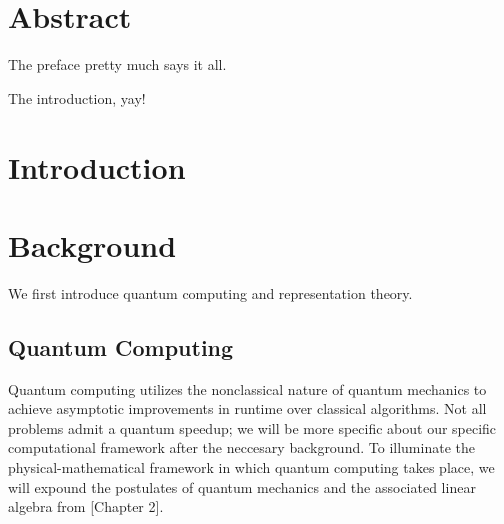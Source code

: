 \documentclass[12pt,twoside]{reedthesis}
\theoremstyle{plain}   %
\theoremstyle{definition}
\theoremstyle{remark}
\numberwithin{equation}{section}
\begin{document}
        \tableofcontents
        \listoftables
        \listoffigures

        \mainmatter %
        \pagestyle{fancyplain} %
        
        \chapter*{Abstract}
	The preface pretty much says it all.
	\onehalfspacing

	The introduction, yay!



        \chapter*{Introduction}
        
    \chapter{Background}
    
   We first introduce quantum computing and representation theory.
   \section{Quantum Computing}
   Quantum computing utilizes the nonclassical nature of quantum mechanics to achieve asymptotic improvements in runtime over classical algorithms.
   Not all problems admit a quantum speedup; we will be more specific about our specific computational framework after the neccesary background.
   To illuminate the physical-mathematical framework in which quantum computing takes place, we will expound the postulates of quantum mechanics and the associated linear algebra from \cite{nielsen2010}[Chapter 2].
\end{document}
